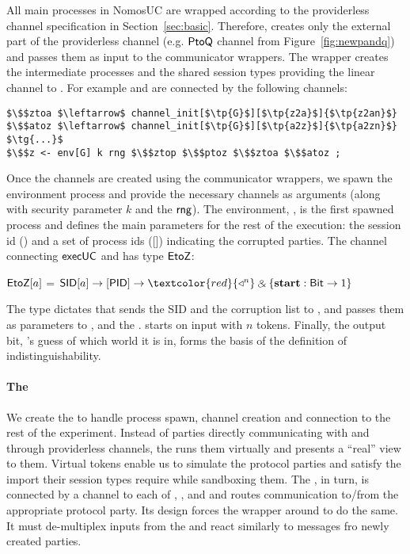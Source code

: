 All main processes in NomosUC are wrapped according to the providerless channel specification in Section~\ref{sec:basic}. 
Therefore,  creates only the external part of the providerless channel (e.g. $\mathsf{PtoQ}$ channel from Figure~\ref{fig:newpandq})
and passes them as input to the communicator wrappers.
The wrapper creates the intermediate processes and the shared session types providing the linear channel to .
For example \Z and \A are connected by the following channels:
\begin{lstlisting}[basicstyle=\footnotesize\BeraMonottFamily, mathescape]
$\$$ztoa $\leftarrow$ channel_init[$\tp{G}$][$\tp{z2a}$]{$\tp{z2an}$}
$\$$atoz $\leftarrow$ channel_init[$\tp{G}$][$\tp{a2z}$]{$\tp{a2zn}$}
$\tg{...}$
$\$$z <- env[G] k rng $\$$ztop $\$$ptoz $\$$ztoa $\$$atoz ;
\end{lstlisting}
Once the channels are created using the communicator wrappers, we spawn the
environment process and provide the necessary channels as arguments (along with
security parameter $k$ and the $\mathsf{rng}$).
The environment, \Z, is the first spawned process and defines the main parameters for the rest of the execution: the session id () and a set of
process ids ([]) indicating the corrupted parties.
The channel connecting $\mathsf{execUC}$ and \Z has type $\mathsf{EtoZ}$:
\begin{center}
\vspace{-2mm}
\parbox{0cm}{
\begin{tabbing}
 $\mathsf{EtoZ}[a]$ = $\m{SID}[a] \arrow [\m{PID}] \arrow \textcolor{red}{\getpot^n} \echoice{\mb{start}: \m{Bit} \arrow 1}$
 \end{tabbing}}
\vspace{-2mm}
\end{center}
The type dictates that \Z sends the SID and the corruption list to ,
and  passes them as parameters to \F, \A and the \partywrapper.  
\Z starts on input  with $n$ tokens. 
Finally, the output bit, \Z's guess of which world it is in, forms the basis of the definition of indistinguishability.


\paragraph*{\textbf{The \partywrapper}}
We create the \partywrapper to handle process spawn, channel creation and connection to the rest of the experiment.
Instead of parties directly communicating with \F and \Z through providerless channels, the \partywrapper runs them virtually and presents a ``real'' view to them.
Virtual tokens enable us to simulate the protocol parties and satisfy the import their session types require while sandboxing them. 
The \partywrapper, in turn, is connected by a channel to each of \F, \Z, and \A and routes communication to/from the appropriate protocol party. 
Its design forces the wrapper around \F to do the same. It must de-multiplex inputs from the \partywrapper and react similarly to messages fro newly created parties. 

